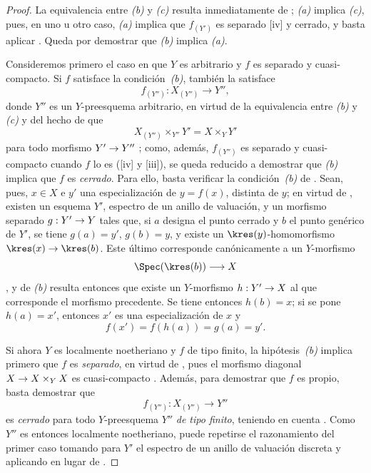 \documentclass[oneside,10pt]{amsart}
\makeatletter
\newcommand{\ega@arrow}[2]{\mathchoice{#1}{#2}{#2}{#2}}
\renewcommand{\to}{\ega@arrow{\longrightarrow}{\rightarrow}}
\makeatother
\begin{document}
\begin{proof}
La equivalencia entre \emph{(b)} y \emph{(c)} resulta inmediatamente de ;
\emph{(a)} implica \emph{(c)}, pues, en uno u otro caso, \emph{(a)} implica que $f_{(Y')}$ es separado [iv] y cerrado, y basta aplicar .
Queda por demostrar que \emph{(b)} implica \emph{(a)}.

Consideremos primero el caso en que $Y$ es arbitrario y $f$ es separado y cuasi-compacto.
Si $f$ satisface la condición~\emph{(b)}, también la satisface
\[
  f_{(Y'')}:X_{(Y'')}\longrightarrow Y'',
\]
donde $Y''$ es un $Y$-preesquema arbitrario, en virtud de la equivalencia entre \emph{(b)} y \emph{(c)} y del hecho de que
\[
  X_{(Y'')}\times_{Y''}Y'=X\times_Y Y'
\]
para todo morfismo $Y'\to Y''$ ;
como, además, $f_{(Y'')}$ es separado y cuasi-compacto cuando $f$ lo es ([iv] y [iii]), se queda reducido a demostrar que \emph{(b)} implica que $f$ es \emph{cerrado}.
Para ello, basta verificar la condición~\emph{(b)} de .
Sean, pues, $x\in X$ e $y'$ una especialización de $y=f(x)$, distinta de $y$;
en virtud de , existen un esquema $Y'$, espectro de un anillo de valuación, y un morfismo separado $g:Y'\to Y$ tales que, si $a$ designa el punto cerrado y $b$ el punto genérico de $Y'$, se tiene $g(a)=y'$, $g(b)=y$, y existe un $\kres(y)$-homomorfismo $\kres(x)\to\kres(b)$.
Este último corresponde canónicamente a un $Y$-morfismo
\[
  \Spec(\kres(b))\longrightarrow X
\]
, y de \emph{(b)} resulta entonces que existe un $Y$-morfismo $h:Y'\to X$ al que corresponde el morfismo precedente.
Se tiene entonces $h(b)=x$;
si se pone $h(a)=x'$, entonces $x'$ es una especialización de $x$ y
\[
  f(x')=f(h(a))=g(a)=y'.
\]

Si ahora $Y$ es localmente noetheriano y $f$ de tipo finito, la hipótesis~\emph{(b)} implica primero que $f$ es \emph{separado}, en virtud de , pues el morfismo diagonal $X\to X\times_Y X$ es cuasi-compacto .
Además, para demostrar que $f$ es propio, basta demostrar que
\[
  f_{(Y'')}:X_{(Y'')}\longrightarrow Y''
\]
es \emph{cerrado} para todo $Y$-preesquema $Y''$ \emph{de tipo finito}, teniendo en cuenta .
Como $Y''$ es entonces localmente noetheriano, puede repetirse el razonamiento del primer caso tomando para $Y'$ el espectro de un anillo de valuación discreta y aplicando  en lugar de .
\end{proof}
\end{document}
